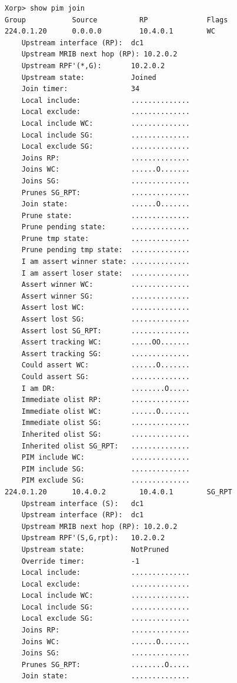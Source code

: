 \documentclass[11pt]{report}
\begin{document}
\begin{itemize}
\begin{verbatim}
Xorp> show pim join 
Group           Source          RP              Flags
224.0.1.20      0.0.0.0         10.4.0.1        WC   
    Upstream interface (RP):  dc1
    Upstream MRIB next hop (RP): 10.2.0.2
    Upstream RPF'(*,G):       10.2.0.2
    Upstream state:           Joined 
    Join timer:               34
    Local include:            ..............
    Local exclude:            ..............
    Local include WC:         ..............
    Local include SG:         ..............
    Local exclude SG:         ..............
    Joins RP:                 ..............
    Joins WC:                 ......O.......
    Joins SG:                 ..............
    Prunes SG_RPT:            ..............
    Join state:               ......O.......
    Prune state:              ..............
    Prune pending state:      ..............
    Prune tmp state:          ..............
    Prune pending tmp state:  ..............
    I am assert winner state: ..............
    I am assert loser state:  ..............
    Assert winner WC:         ..............
    Assert winner SG:         ..............
    Assert lost WC:           ..............
    Assert lost SG:           ..............
    Assert lost SG_RPT:       ..............
    Assert tracking WC:       .....OO.......
    Assert tracking SG:       ..............
    Could assert WC:          ......O.......
    Could assert SG:          ..............
    I am DR:                  ........O.....
    Immediate olist RP:       ..............
    Immediate olist WC:       ......O.......
    Immediate olist SG:       ..............
    Inherited olist SG:       ..............
    Inherited olist SG_RPT:   ..............
    PIM include WC:           ..............
    PIM include SG:           ..............
    PIM exclude SG:           ..............
224.0.1.20      10.4.0.2        10.4.0.1        SG_RPT 
    Upstream interface (S):   dc1
    Upstream interface (RP):  dc1
    Upstream MRIB next hop (RP): 10.2.0.2
    Upstream RPF'(S,G,rpt):   10.2.0.2
    Upstream state:           NotPruned 
    Override timer:           -1
    Local include:            ..............
    Local exclude:            ..............
    Local include WC:         ..............
    Local include SG:         ..............
    Local exclude SG:         ..............
    Joins RP:                 ..............
    Joins WC:                 ......O.......
    Joins SG:                 ..............
    Prunes SG_RPT:            ........O.....
    Join state:               ..............

\end{verbatim}
\end{itemize}
\end{document}
